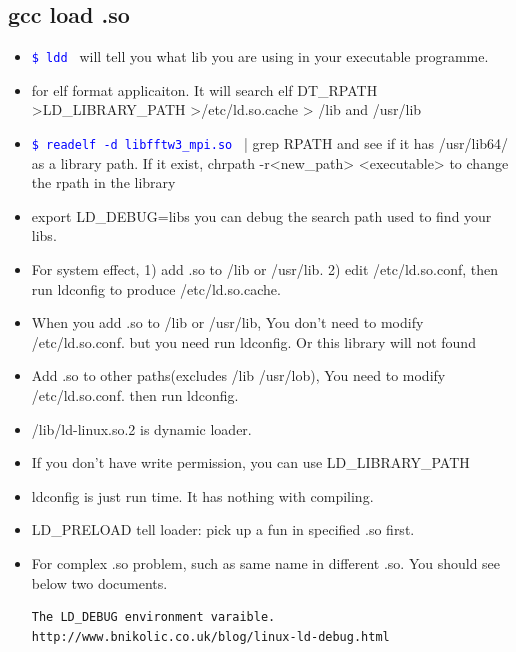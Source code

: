 \documentclass[a4paper,12pt,twoside]{book}
\newcommand{\linuxcommand}[1]{\texttt{\textcolor{blue}{\$ #1 \Pisymbol{psy}{191}}}}
\begin{document}
\subsection{gcc load .so}

		\begin{itemize}
  		 \item \linuxcommand{ldd} will tell you what lib you are using in your executable programme.

				\item for elf format applicaiton. It will search elf DT\_RPATH >LD\_LIBRARY\_PATH >/etc/ld.so.cache > /lib and /usr/lib

				\item \linuxcommand{readelf -d libfftw3\_mpi.so} | grep RPATH and see if it has /usr/lib64/ as a library path. If it exist, chrpath -r<new\_path> <executable> to change the rpath in the library 

				\item export LD\_DEBUG=libs you can debug the search path used to find your libs.

				\item For system effect, 1) add .so to /lib or /usr/lib. 2) edit /etc/ld.so.conf, then run ldconfig to produce /etc/ld.so.cache.

				\item When you add .so to /lib or /usr/lib, You don't need to modify /etc/ld.so.conf. but you need run ldconfig.  Or this library will not found 

				\item Add .so to other paths(excludes /lib /usr/lob), You need to modify /etc/ld.so.conf. then run ldconfig. 
						
				\item /lib/ld-linux.so.2 is dynamic loader. 

				\item If you don't have write permission, you can use LD\_LIBRARY\_PATH

				\item ldconfig is just run time. It has nothing with compiling. 

				\item LD\_PRELOAD tell loader: pick up a fun in specified .so first. 

				\item For complex .so problem, such as same name in different .so.  You should see below two documents. 

\begin{verbatim}
The LD_DEBUG environment varaible.
http://www.bnikolic.co.uk/blog/linux-ld-debug.html	


\end{verbatim}
\end{itemize}
\end{document}

